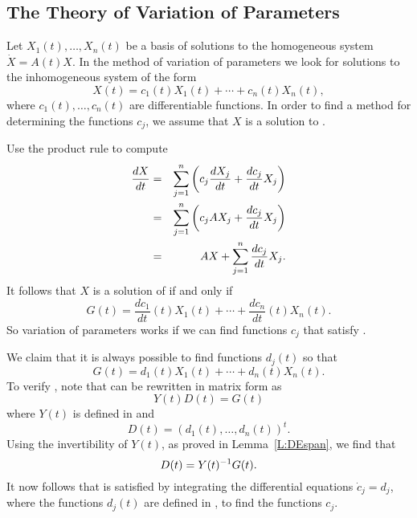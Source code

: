\documentclass{ximera}
\begin{document}
\subsection*{The Theory of Variation of Parameters}

Let $X_1(t),\ldots,X_n(t)$ be a 
basis of solutions to the homogeneous 
system $\dot{X}=A(t)X$.   In the method of variation of parameters we look 
for solutions to  the inhomogeneous system  of the form
\[
X(t) = c_1(t)X_1(t) + \cdots + c_n(t)X_n(t),
\]
where $c_1(t),\ldots,c_n(t)$ are differentiable functions.  In order to 
find a method for determining the functions $c_j$, we assume that $X$ is 
a solution to .  

Use the product rule to compute
\begin{eqnarray*}
\displaystyle\frac{dX}{dt} & = &\sum_{j=1}^n\left(c_j\frac{dX_j}{dt}
+\frac{dc_j}{dt} X_j\right)\\
& = & \sum_{j=1}^n\left( c_jAX_j+\frac{dc_j}{dt}X_j\right)\\
& = & AX+\sum_{j=1}^n \frac{dc_j}{dt}X_j.
\end{eqnarray*}
It follows that $X$ is a solution of  if and only if
\begin{equation}  \label{eq:dcjXj}
G(t) = \frac{dc_1}{dt}(t) X_1(t) + \cdots + \frac{dc_n}{dt}(t) X_n(t).
\end{equation}
So variation of parameters works if we can find functions $c_j$ that 
satisfy .

We claim that it is always possible to find functions $d_j(t)$ so that 
\begin{equation}  \label{E:djXj}
G(t) = d_1(t)X_1(t) + \cdots + d_n(t)X_n(t).
\end{equation} 
To verify , note that   can be rewritten in matrix 
form as
\[
Y(t) D(t) = G(t)
\]
where $Y(t)$ is defined in  and
\[
D(t)=(d_1(t),\ldots,d_n(t))^t.
\]
Using the invertibility of 
$Y(t)$, as proved in Lemma~\ref{L:DEspan}, we find that
\[
D(t) = Y(t)^{-1} G(t).
\] 
It now follows that  is satisfied by integrating the 
differential equations $\dot{c}_j=d_j$, where the functions $d_j(t)$ 
are defined in , to find the functions $c_j$.  
\end{document}
